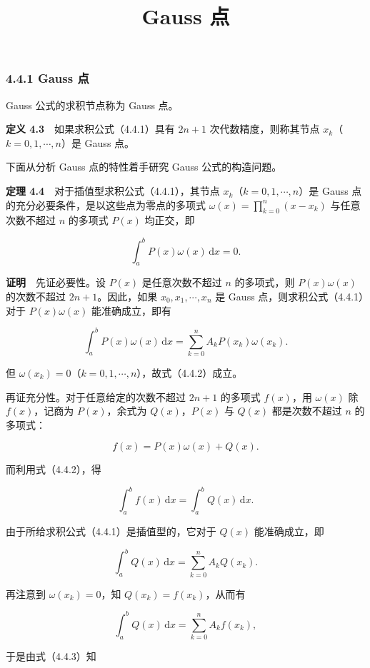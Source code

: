 \documentclass[
  10pt,
  fontset=fandol]{ctexart}
\title{Gauss 点}
\author{}
\date{}
\begin{document}
\maketitle

\subsubsection{4.4.1 Gauss 点}\label{gauss-ux70b9}

Gauss 公式的求积节点称为 Gauss 点。

\textbf{定义 4.3}　如果求积公式（4.4.1）具有 \(2n+1\) 次代数精度，则称其节点 \(x_k\)（\(k=0,1,\cdots,n\)）是 Gauss 点。

下面从分析 Gauss 点的特性着手研究 Gauss 公式的构造问题。

\textbf{定理 4.4}　对于插值型求积公式（4.4.1），其节点 \(x_k\)（\(k=0,1,\cdots,n\)）是 Gauss 点的充分必要条件，是以这些点为零点的多项式 \(\displaystyle\omega(x)=\prod_{k=0}^{n}(x-x_k)\) 与任意次数不超过 \(n\) 的多项式 \(P(x)\) 均正交，即

\[
\int_a^b P(x)\omega(x)\,\mathrm{d}x=0.
\tag{4.4.2}
\]

\textbf{证明}　先证必要性。设 \(P(x)\) 是任意次数不超过 \(n\) 的多项式，则 \(P(x)\omega(x)\) 的次数不超过 \(2n+1\)。因此，如果 \(x_0,x_1,\cdots,x_n\) 是 Gauss 点，则求积公式（4.4.1）对于 \(P(x)\omega(x)\) 能准确成立，即有

\[
\int_a^b P(x)\omega(x)\,\mathrm{d}x
=\sum_{k=0}^{n}A_kP(x_k)\omega(x_k).
\]

但 \(\omega(x_k)=0\)（\(k=0,1,\cdots,n\)），故式（4.4.2）成立。

再证充分性。对于任意给定的次数不超过 \(2n+1\) 的多项式 \(f(x)\)，用 \(\omega(x)\) 除 \(f(x)\)，记商为 \(P(x)\)，余式为 \(Q(x)\)，\(P(x)\) 与 \(Q(x)\) 都是次数不超过 \(n\) 的多项式：

\[
f(x)=P(x)\omega(x)+Q(x).
\]

而利用式（4.4.2），得

\[
\int_a^b f(x)\,\mathrm{d}x=\int_a^b Q(x)\,\mathrm{d}x.
\tag{4.4.3}
\]

由于所给求积公式（4.4.1）是插值型的，它对于 \(Q(x)\) 能准确成立，即

\[
\int_a^b Q(x)\,\mathrm{d}x=\sum_{k=0}^{n}A_kQ(x_k).
\]

再注意到 \(\omega(x_k)=0\)，知 \(Q(x_k)=f(x_k)\)，从而有

\[
\int_a^b Q(x)\,\mathrm{d}x=\sum_{k=0}^{n}A_kf(x_k),
\]

于是由式（4.4.3）知
\end{document}
